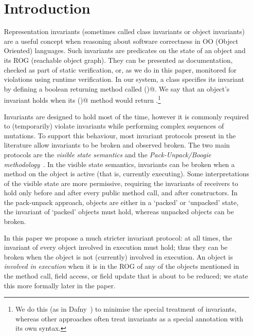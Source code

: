 \section{Introduction}
\label{s:intro}
Representation invariants (sometimes called class invariants or object invariants) are
a useful concept when reasoning about software correctness in OO (Object Oriented) languages. Such invariants are predicates on the state of an object and its ROG (reachable object graph).
They can be presented as documentation, checked as part of static verification, or, as we do in this paper, monitored for violations using runtime verification.
In our system, a class specifies its invariant by defining a boolean returning method called \Q@invariant()@.
We say that an object's invariant holds when its \Q@invariant()@ method would return \Q@true@.\footnote{We do this (as in Dafny~\cite{DBLP:conf/sigada/Leino12}) to minimise the special treatment of invariants, whereas other approaches often treat invariants as a special annotation with its own syntax.}

Invariants are designed to hold most of the time, however it is commonly required to (temporarily) violate invariants while performing complex sequences of mutations.
To support this behaviour, most invariant protocols present in the literature allow invariants to be broken and observed broken.
The two main protocols are the \emph{visible state semantics} \cite{Meyer:1988:OSC:534929} and the \emph{Pack-Unpack/Boogie methodology}~\cite{DBLP:journals/jot/BarnettDFLS04}.
In the visible state semantics, invariants can be broken when a method on the object is active (that is, currently executing).
Some interpretations of the visible state are more permissive, requiring the invariants of receivers to hold only before and after every public method call, and after constructors. 
In the pack-unpack approach, objects are either in a `packed' or `unpacked' state, 
the invariant of `packed' objects must hold, whereas unpacked objects can be broken.

In this paper we propose a much stricter invariant protocol: at all times, the invariant of every object involved in execution must hold; thus they can be broken when the object is not (currently) involved in execution. 
An object is \emph{involved in execution} when it is in the ROG of any of the objects mentioned in the method call, field access, or field update that is about to be reduced; we state this more formally later in the paper.

